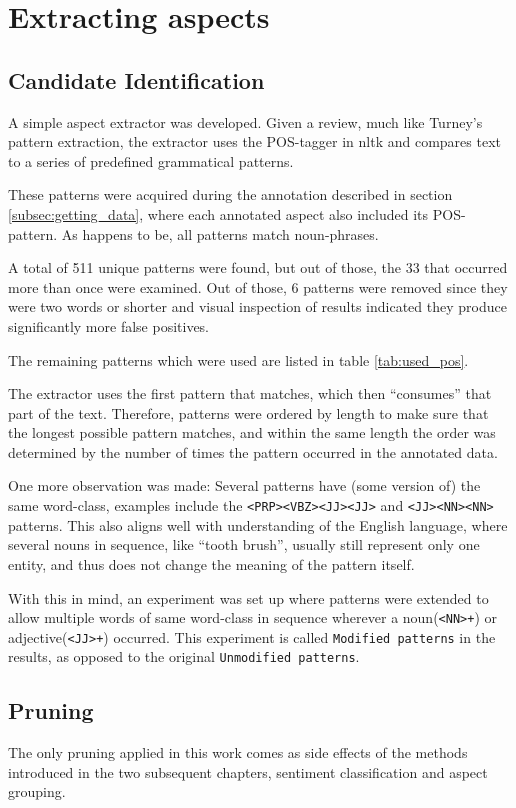 \documentclass[a4paper,11pt]{kth-mag}
\begin{document}
\section{Extracting aspects}
\subsection{Candidate Identification}
A simple aspect extractor was developed. Given a review, much like Turney's pattern extraction,
the extractor uses the POS-tagger in nltk\cite{nltk} and
compares text to a series of predefined grammatical patterns.

These patterns were acquired during the annotation described in section \ref{subsec:getting_data},
where each annotated aspect also included its POS-pattern. As happens to be, all patterns match noun-phrases.

A total of 511 unique patterns were found, but out of those, the 33 that occurred more than
once were examined. Out of those, 6 patterns were removed since they were two words or shorter
and visual inspection of results indicated they produce significantly more false positives.

The remaining patterns which were used are listed in table \ref{tab:used_pos}.

The extractor uses the first pattern that matches, which then ``consumes'' that part of the text.
Therefore, patterns were ordered by length to make sure that the longest possible pattern
matches, and within the same length the order was determined by
the number of times the pattern occurred in the annotated data.

One more observation was made: Several patterns have (some version of) the same word-class,
examples include the \texttt{<PRP><VBZ><JJ><JJ>} and \texttt{<JJ><NN><NN>} patterns.
This also aligns well with understanding of the English language, where several nouns in sequence,
like ``tooth brush'', usually still represent only one entity, and thus does not change
the meaning of the pattern itself.

With this in mind, an experiment was set up where patterns were extended to allow
multiple words of same word-class in sequence wherever a noun(\texttt{<NN>+})
or adjective(\texttt{<JJ>+}) occurred.
This experiment is called \texttt{Modified patterns} in the results, as opposed to
the original \texttt{Unmodified patterns}.


\subsection{Pruning}
\label{subsec:pruning}
The only pruning applied in this work comes as side effects of the methods introduced
in the two subsequent chapters, sentiment classification and aspect grouping.
\end{document}

